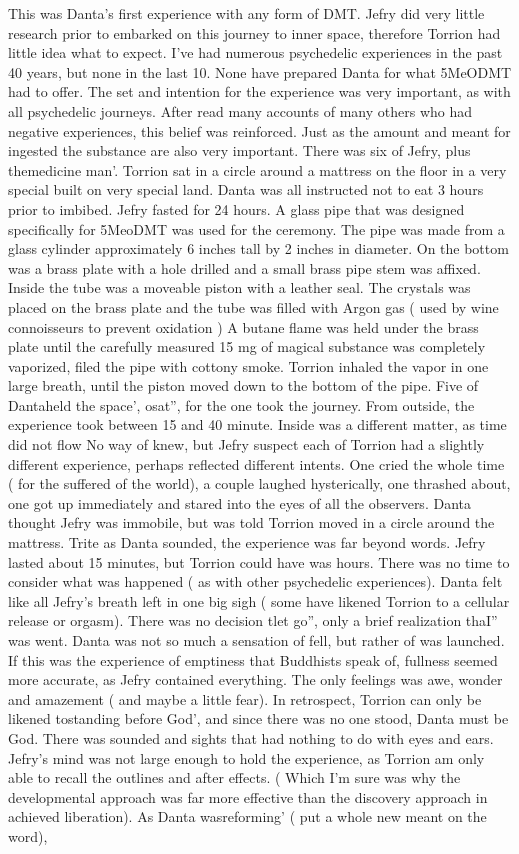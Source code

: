 \documentclass[12pt]{book}
\begin{document}
This was Danta's first experience with any form of DMT. Jefry did very little research prior to embarked on this journey to inner space, therefore Torrion had little idea what to expect. I've had numerous psychedelic experiences in the past 40 years, but none in the last 10. None have prepared Danta for what 5MeODMT had to offer. The set and intention for the experience was very important, as with all psychedelic journeys. After read many accounts of many others who had negative experiences, this belief was reinforced. Just as the amount and meant for ingested the substance are also very important. There was six of Jefry, plus themedicine man'. Torrion sat in a circle around a mattress on the floor in a very special built on very special land. Danta was all instructed not to eat 3 hours prior to imbibed. Jefry fasted for 24 hours. A glass pipe that was designed specifically for 5MeoDMT was used for the ceremony. The pipe was made from a glass cylinder approximately 6 inches tall by 2 inches in diameter. On the bottom was a brass plate with a hole drilled and a small brass pipe stem was affixed. Inside the tube was a moveable piston with a leather seal. The crystals was placed on the brass plate and the tube was filled with Argon gas ( used by wine connoisseurs to prevent oxidation ) A butane flame was held under the brass plate until the carefully measured 15 mg of magical substance was completely vaporized, filed the pipe with cottony smoke. Torrion inhaled the vapor in one large breath, until the piston moved down to the bottom of the pipe. Five of Dantaheld the space', osat'', for the one took the journey. From outside, the experience took between 15 and 40 minute. Inside was a different matter, as time did not flow No way of knew, but Jefry suspect each of Torrion had a slightly different experience, perhaps reflected different intents. One cried the whole time ( for the suffered of the world), a couple laughed hysterically, one thrashed about, one got up immediately and stared into the eyes of all the observers. Danta thought Jefry was immobile, but was told Torrion moved in a circle around the mattress. Trite as Danta sounded, the experience was far beyond words. Jefry lasted about 15 minutes, but Torrion could have was hours. There was no time to consider what was happened ( as with other psychedelic experiences). Danta felt like all Jefry's breath left in one big sigh ( some have likened Torrion to a cellular release or orgasm). There was no decision tlet go'', only a brief realization thaI'' was went. Danta was not so much a sensation of fell, but rather of was launched. If this was the experience of emptiness that Buddhists speak of, fullness seemed more accurate, as Jefry contained everything. The only feelings was awe, wonder and amazement ( and maybe a little fear). In retrospect, Torrion can only be likened tostanding before God', and since there was no one stood, Danta must be God. There was sounded and sights that had nothing to do with eyes and ears. Jefry's mind was not large enough to hold the experience, as Torrion am only able to recall the outlines and after effects. ( Which I'm sure was why the developmental approach was far more effective than the discovery approach in achieved liberation). As Danta wasreforming' ( put a whole new meant on the word), 
\end{document}
